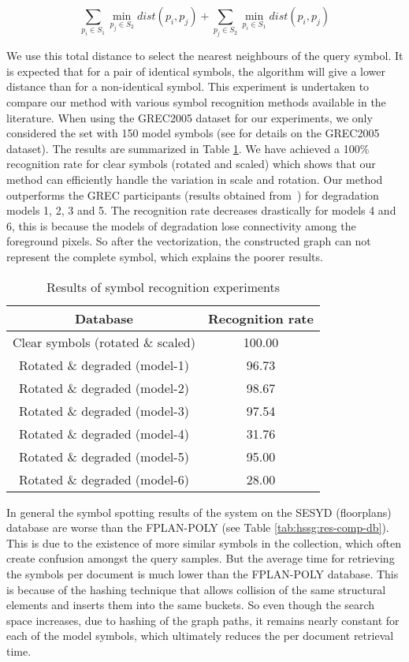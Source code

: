 \begin{equation*}
\sum_{p_i \in S_1} \min_{p_j \in S_2} dist(p_i,p_j)+\sum_{p_j \in S_2} \min_{p_i \in S_1} dist(p_i,p_j)
\label{eqn:hssg:tot_dist}
\end{equation*}

We use this total distance to select the nearest neighbours of the query symbol. It is expected that for a pair of identical symbols, the algorithm will give a lower distance than for a non-identical symbol. This experiment is undertaken to compare our method with various symbol recognition methods available in the literature. When using the GREC2005 dataset for our experiments, we only considered the set with 150 model symbols (see  for details on the GREC2005 dataset). The results are summarized in Table \ref{tab:hssg:res-comp-symb-rec}. We have achieved a 100\% recognition rate for clear symbols (rotated and scaled) which shows that our method can efficiently handle the variation in scale and rotation. Our method outperforms the GREC participants (results obtained from~\cite{Dosch2006}) for degradation models 1, 2, 3 and 5. The recognition rate decreases drastically for models 4 and 6, this is because the models of degradation lose connectivity among the foreground pixels. So after the vectorization, the constructed graph can not represent the complete symbol, which explains the poorer results.

\begin{table}[h!]
\centering
\caption{Results of symbol recognition experiments}
\begin{tabular}{cc}
\toprule
\hline
\textbf{Database} & \textbf{Recognition rate}\\
\hline 
Clear symbols (rotated \& scaled) & 100.00 \\
Rotated \& degraded (model-1) & 96.73 \\
Rotated \& degraded (model-2) & 98.67 \\
Rotated \& degraded (model-3) & 97.54 \\
Rotated \& degraded (model-4) & 31.76 \\
Rotated \& degraded (model-5) & 95.00 \\
Rotated \& degraded (model-6) & 28.00 \\
\hline
\end{tabular}
\label{tab:hssg:res-comp-symb-rec}
\end{table}

In general the symbol spotting results of the system on the SESYD (floorplans) database are worse than the FPLAN-POLY (see Table \ref{tab:hssg:res-comp-db}). This is due to the existence of more similar symbols in the collection, which often create confusion amongst the query samples. But the average time for retrieving the symbols per document is much lower than the FPLAN-POLY database. This is because of the hashing technique that allows collision of the same structural elements and inserts them into the same buckets. So even though the search space increases, due to hashing of the graph paths, it remains nearly constant for each of the model symbols, which ultimately reduces the per document retrieval time.

